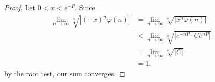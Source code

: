 \documentclass[a4paper]{article}
\theoremstyle{definition}
\begin{document}
\begin{proof}
    Let $0 < x < e^{-P}$.
    Since
    \begin{align*}
        \lim_{n \to \infty} \sqrt[n]{\left\lvert (-x)^n \varphi(n) \right\rvert} & = \lim_{n \to \infty} \sqrt[n]{\left\lvert x^n \varphi(n) \right\rvert}        \\
                                                                                 & < \lim_{n \to \infty} \sqrt[n]{\left\lvert e^{-nP} \cdot Ce^{nP} \right\rvert} \\
                                                                                 & = \lim_{n \to \infty} \sqrt[n]{\left\lvert C \right\rvert}                     \\
                                                                                 & = 1,
    \end{align*}
    by the root test, our sum converges.


\end{proof}
\end{document}
